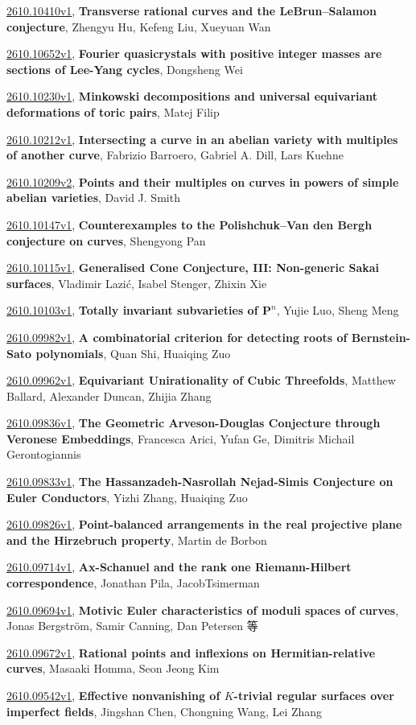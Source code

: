 \documentclass[9pt, a4paper]{article}
\theoremstyle{plain}
\theoremstyle{definition}
\theoremstyle{remark}
\newcommand{\arxiv}[3]{\href{https://arxiv.org/abs/#1}{#1}, \textbf{\textcolor{arxivblue}{#2}}, #3}
\begin{document}
\arxiv{2610.10410v1}{Transverse rational curves and the LeBrun--Salamon conjecture}{Zhengyu Hu, Kefeng Liu, Xueyuan Wan}

\arxiv{2610.10652v1}{Fourier quasicrystals with positive integer masses are sections of Lee-Yang cycles}{Dongsheng Wei}

\arxiv{2610.10230v1}{Minkowski decompositions and universal equivariant deformations of toric pairs}{Matej Filip}

\arxiv{2610.10212v1}{Intersecting a curve in an abelian variety with multiples of another curve}{Fabrizio Barroero, Gabriel A. Dill, Lars Kuehne}

\arxiv{2610.10209v2}{Points and their multiples on curves in powers of simple abelian varieties}{David J. Smith}

\arxiv{2610.10147v1}{Counterexamples to the Polishchuk--Van den Bergh conjecture on curves}{Shengyong Pan}

\arxiv{2610.10115v1}{Generalised Cone Conjecture, III: Non-generic Sakai surfaces}{Vladimir Lazić, Isabel Stenger, Zhixin Xie}

\arxiv{2610.10103v1}{Totally invariant subvarieties of $\mathbf P^n$}{Yujie Luo, Sheng Meng}

\arxiv{2610.09982v1}{A combinatorial criterion for detecting roots of Bernstein-Sato polynomials}{Quan Shi, Huaiqing Zuo}

\arxiv{2610.09962v1}{Equivariant Unirationality of Cubic Threefolds}{Matthew Ballard, Alexander Duncan, Zhijia Zhang}

\arxiv{2610.09836v1}{The Geometric Arveson-Douglas Conjecture through Veronese Embeddings}{Francesca Arici, Yufan Ge, Dimitris Michail Gerontogiannis}

\arxiv{2610.09833v1}{The Hassanzadeh-Nasrollah Nejad-Simis Conjecture on Euler Conductors}{Yizhi Zhang, Huaiqing Zuo}

\arxiv{2610.09826v1}{Point-balanced arrangements in the real projective plane and the Hirzebruch property}{Martin de Borbon}

\arxiv{2610.09714v1}{Ax-Schanuel and the rank one Riemann-Hilbert correspondence}{Jonathan Pila,  JacobTsimerman}

\arxiv{2610.09694v1}{Motivic Euler characteristics of moduli spaces of curves}{Jonas Bergström, Samir Canning, Dan Petersen 等}

\arxiv{2610.09672v1}{Rational points and inflexions on Hermitian-relative curves}{Masaaki Homma, Seon Jeong Kim}

\arxiv{2610.09542v1}{Effective nonvanishing of $K$-trivial regular surfaces over imperfect fields}{Jingshan Chen, Chongning Wang, Lei Zhang}
\end{document}
